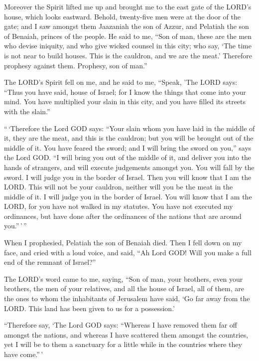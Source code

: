  Moreover the Spirit lifted me up and brought me to the
east gate of the LORD's house, which looks eastward. Behold, twenty-five
men were at the door of the gate; and I saw amongst them Jaazaniah the
son of Azzur, and Pelatiah the son of Benaiah, princes of the people.
 He said to me, ``Son of man, these are the men who devise
iniquity, and who give wicked counsel in this city;  who
say, `The time is not near to build houses. This is the cauldron, and we
are the meat.'  Therefore prophesy against them. Prophesy,
son of man.''

 The LORD's Spirit fell on me, and he said to me, ``Speak,
'The LORD says: ``Thus you have said, house of Israel; for I know the
things that come into your mind.  You have multiplied your
slain in this city, and you have filled its streets with the slain.''

 ``\,`Therefore the Lord GOD says: ``Your slain whom you
have laid in the middle of it, they are the meat, and this is the
cauldron; but you will be brought out of the middle of it.
 You have feared the sword; and I will bring the sword on
you,'' says the Lord GOD.  ``I will bring you out of the
middle of it, and deliver you into the hands of strangers, and will
execute judgements amongst you.  You will fall by the
sword. I will judge you in the border of Israel. Then you will know that
I am the LORD.  This will not be your cauldron, neither
will you be the meat in the middle of it. I will judge you in the border
of Israel.  You will know that I am the LORD, for you
have not walked in my statutes. You have not executed my ordinances, but
have done after the ordinances of the nations that are around
you.''\,'\,''

 When I prophesied, Pelatiah the son of Benaiah died.
Then I fell down on my face, and cried with a loud voice, and said, ``Ah
Lord GOD! Will you make a full end of the remnant of Israel?''

 The LORD's word came to me, saying, 
``Son of man, your brothers, even your brothers, the men of your
relatives, and all the house of Israel, all of them, are the ones to
whom the inhabitants of Jerusalem have said, `Go far away from the LORD.
This land has been given to us for a possession.'

 ``Therefore say, `The Lord GOD says: ``Whereas I have
removed them far off amongst the nations, and whereas I have scattered
them amongst the countries, yet I will be to them a sanctuary for a
little while in the countries where they have come.''\,'

